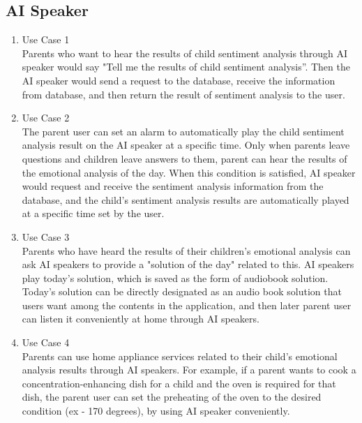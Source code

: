 \documentclass[conference]{IEEEtran}
\begin{document}
\subsection{AI Speaker}
\begin{enumerate}
    \item Use Case 1 
    \\Parents who want to hear the results of child sentiment analysis through AI speaker would say "Tell me the results of child sentiment analysis”. Then the AI speaker would send a request to the database, receive the information from database, and then return the result of sentiment analysis to the user.
    \item Use Case 2
    \\The parent user can set an alarm to automatically play the child sentiment analysis result on the AI speaker at a specific time. Only when parents leave questions and children leave answers to them, parent can hear the results of the emotional analysis of the day. When this condition is satisfied, AI speaker would request and receive the sentiment analysis information from the database, and the child's sentiment analysis results are automatically played at a specific time set by the user.
    \item Use Case 3
    \\Parents who have heard the results of their children's emotional analysis can ask AI speakers to provide a "solution of the day" related to this. AI speakers play today's solution, which is saved as the form of audiobook solution. Today's solution can be directly designated as an audio book solution that users want among the contents in the application, and then later parent user can listen it conveniently at home through AI speakers.
    \item Use Case 4 
    \\Parents can use home appliance services related to their child's emotional analysis results through AI speakers. For example, if a parent wants to cook a concentration-enhancing dish for a child and the oven is required for that dish, the parent user can set the preheating of the oven to the desired condition (ex - 170 degrees), by using AI speaker conveniently.
\end{enumerate}
\newpage
\end{document}
